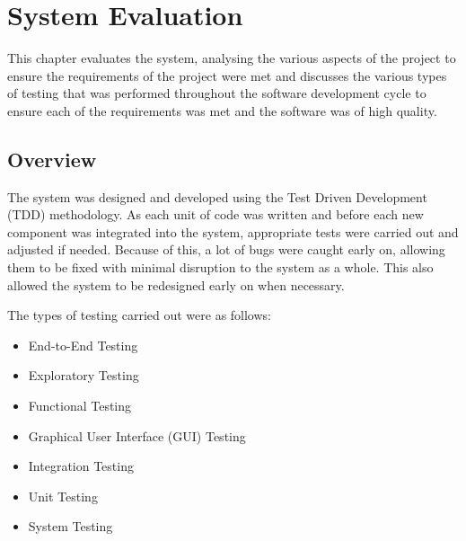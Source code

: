 \chapter{System Evaluation}
This chapter evaluates the system, analysing the various aspects of the project 
to ensure the requirements of the project were met and discusses the various 
types of testing that was performed throughout the software development cycle to
ensure each of the requirements was met and the software was of high quality. 

\section{Overview}
The system was designed and developed using the Test Driven Development (TDD) 
methodology. As each unit of code was written and before each new component was 
integrated into the system, appropriate tests were carried out and adjusted if 
needed. Because of this, a lot of bugs were caught early on, allowing them to be
fixed with minimal disruption to the system as a whole. This also allowed the 
system to be redesigned early on when necessary.

\par
\bigskip
The types of testing carried out were as follows:

\begin{itemize}
    \item End-to-End Testing
    \item Exploratory Testing
    \item Functional Testing
    \item Graphical User Interface (GUI) Testing
    \item Integration Testing
    \item Unit Testing
    \item System Testing
\end{itemize}

